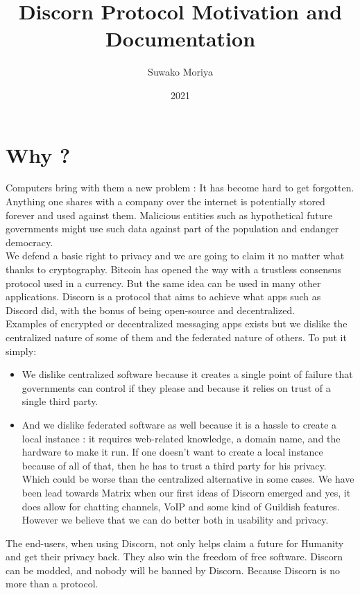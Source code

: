 \documentclass[a4paper,10pt]{article}
\title{Discorn Protocol Motivation and Documentation}
\author{Suwako Moriya}
\date{2021}
\begin{document}
    \maketitle
    \tableofcontents
    \section{Why ?}
        Computers bring with them a new problem : It has become hard to get forgotten.
        Anything one shares with a company over the internet is potentially stored forever and used against them.
        Malicious entities such as hypothetical future governments might use such data against part of the population
        and endanger democracy.\\
        
        We defend a basic right to privacy and we are going to claim it no matter what thanks to cryptography.
        Bitcoin has opened the way with a trustless consensus protocol used in a currency. But the same idea
        can be used in many other applications. Discorn is a protocol that aims to achieve what apps such as Discord did,
        with the bonus of being open-source and decentralized.\\
        
        
        Examples of encrypted or decentralized messaging apps exists but we dislike the centralized nature of some of them
        and the federated nature of others. To put it simply:
        \begin{itemize}
         \item We dislike centralized software because it creates a single point of failure that governments can control
         if they please and because it relies on trust of a single third party.
        
         \item And we dislike federated software as well because it is a hassle to create a local instance : it requires web-related
         knowledge, a domain name, and the hardware to make it run. If one doesn't want to create a local instance because of all of that,
         then he has to trust a third party for his privacy. Which could be worse than the centralized alternative in some cases.
         We have been lead towards Matrix when our first ideas of Discorn emerged and yes, it does allow for chatting channels, VoIP and some kind of Guildish features.
         However we believe that we can do better both in usability and privacy.
        \end{itemize}
        The end-users, when using Discorn, not only helps claim a future for Humanity and get their privacy back. They also win the freedom
        of free software. Discorn can be modded, and nobody will be banned by Discorn. Because Discorn is no more than a protocol.
    
\end{document}
